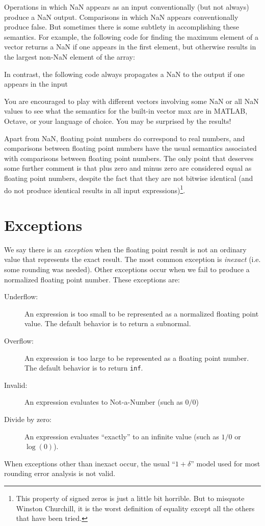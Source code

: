 \documentclass[12pt, leqno]{article} %
\begin{document}
Operations in which NaN appears as an input conventionally (but not always)
produce a NaN output.  Comparisons in which NaN appears conventionally produce false.
But sometimes there is some subtlety in accomplishing these
semantics.  For example, the following code for finding the maximum
element of a vector returns a NaN if one appears
in the first element, but otherwise results in the largest non-NaN
element of the array:

In contrast, the following code always propagates a NaN to the output
if one appears in the input

You are encouraged to play with different vectors involving some NaN
or all NaN values to see what the semantics for the built-in
vector max are in MATLAB, Octave, or your language of choice.
You may be surprised by the results!

Apart from NaN, floating point numbers do correspond to real numbers,
and comparisons between floating point numbers have the usual semantics
associated with comparisons between floating point numbers.  The only
point that deserves some further comment is that plus zero and minus
zero are considered equal as floating point numbers, despite the fact
that they are not bitwise identical (and do not produce identical
results in all input expressions)\footnote{%
This property of signed zeros is just a little bit horrible.
But to misquote Winston Churchill, it is the worst
definition of equality except all the others that have been tried.
}.

\section{Exceptions}

We say there is an {\em exception} when the floating point result is
not an ordinary value that represents the exact result.  The most
common exception is {\em inexact} (i.e. some rounding was needed).
Other exceptions occur when we fail to produce a normalized floating
point number.  These exceptions are:
\begin{description}
\item[Underflow:]
  An expression is too small to be represented as a normalized floating
  point value.  The default behavior is to return a subnormal.
\item[Overflow:]
  An expression is too large to be represented as a floating point
  number.  The default behavior is to return {\tt inf}.
\item[Invalid:]
  An expression evaluates to Not-a-Number (such as $0/0$)
\item[Divide by zero:]
  An expression evaluates ``exactly'' to an infinite value
  (such as $1/0$ or $\log(0)$).
\end{description}
When exceptions other than inexact occur, the usual ``$1 + \delta$''
model used for most rounding error analysis is not valid.
\end{document}
